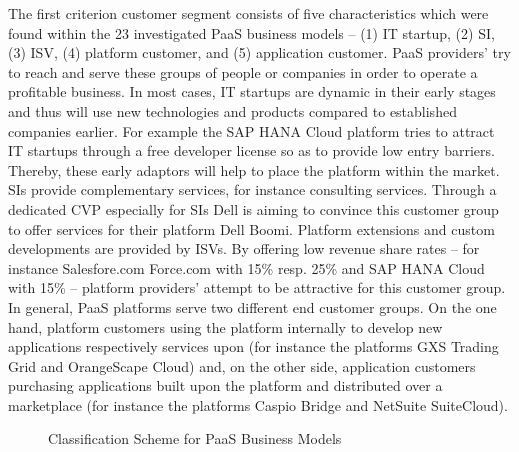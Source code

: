 The first criterion customer segment consists of five characteristics which were found within the 23 investigated \ac{PaaS} business models --  (1) \ac{IT} startup, (2) \ac{SI}, (3) \ac{ISV}, (4) platform customer, and (5) application customer. \ac{PaaS} providers' try to reach and serve these groups of people or companies in order to operate a profitable business. In most cases, \ac{IT} startups are dynamic in their early stages and thus will use new technologies and products compared to established companies earlier. For example the SAP HANA Cloud platform tries to attract \ac{IT} startups through a free developer license so as to provide low entry barriers. Thereby, these early adaptors will help to place the platform within the market. \acp{SI} provide complementary services, for instance consulting services. Through a dedicated \ac{CVP} especially for \acp{SI} Dell is aiming to convince this customer group to offer services for their platform Dell Boomi. Platform extensions and custom developments are provided by \acp{ISV}. By offering low revenue share rates -- for instance Salesfore.com Force.com with 15\% resp. 25\% and SAP HANA Cloud with 15\% -- platform providers' attempt to be attractive for this customer group. In general, \ac{PaaS} platforms serve two different end customer groups. On the one hand, platform customers using the platform internally to develop new applications respectively services upon (for instance the platforms GXS Trading Grid and OrangeScape Cloud) and, on the other side, application customers purchasing applications built upon the platform and distributed over a marketplace (for instance the platforms Caspio Bridge and NetSuite SuiteCloud).

\begin{figure}[tb]
	\centering
	
	\caption{Classification Scheme for PaaS Business Models}
	\label{fig:cs}
\end{figure}

